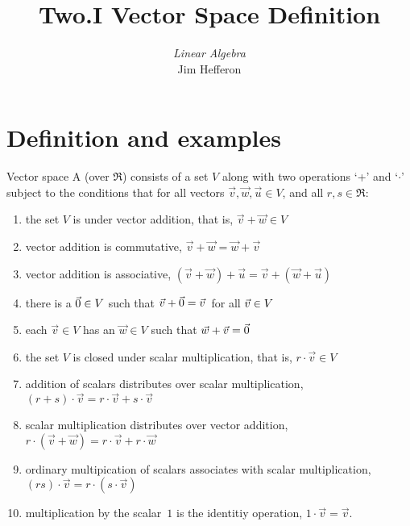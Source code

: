 \documentclass[10pt,t]{beamer}
\title[Vector Space Definition] %
{Two.I Vector Space Definition}
\author{\textit{Linear Algebra} \\ {\small Jim Hef{}feron}}
\institute{
  \texttt{http://joshua.smcvt.edu/linearalgebra}
}
\date{}
\begin{document}
\begin{frame}
  \titlepage
\end{frame}




\section{Definition and examples}





\begin{frame}{Vector space}
A 
(over \( \Re \)) consists of a set \( V \) along with
two operations `+' and `\( \cdot \)' subject to the conditions
that for all vectors \( \vec{v},\vec{w},\vec{u}\in V \), 
and all 
\( r,s\in\Re \):
\begin{enumerate}
\item the set $V$ is  under
  vector addition, that is, 
  \( \vec{v}+\vec{w}\in V \)
\pause\item vector addition is commutative,
  \( \vec{v}+\vec{w}=\vec{w}+\vec{v} \) 
\pause\item vector addition is associative,
  \( (\vec{v}+\vec{w})+\vec{u}=\vec{v}+(\vec{w}+\vec{u}) \)
\pause\item there is a 
    \( \vec{0}\in V \) such that
    \( \vec{v}+\vec{0}=\vec{v}\, \) for all \( \vec{v}\in V\/ \)
\pause\item each \( \vec{v}\in V \) has an
    \( \vec{w}\in V \) such that \( \vec{w}+\vec{v}=\vec{0} \)
\pause\item  the set $V$ is closed under
    scalar multiplication, that is, 
   \( r\cdot\vec{v}\in V \)
\pause\item addition of scalars distributes over scalar multiplication,
 \( (r+s)\cdot\vec{v}=r\cdot\vec{v}+s\cdot\vec{v} \)
\pause\item scalar multiplication distributes over vector addition,
  \( r\cdot(\vec{v}+\vec{w})=r\cdot\vec{v}+r\cdot\vec{w} \)
\pause\item ordinary multipication of scalars associates with 
  scalar multiplication, \( (rs)\cdot\vec{v} =r\cdot(s\cdot\vec{v}) \)
\pause\item multiplication by the scalar~$1$ is the 
  identitiy operation, \( 1\cdot\vec{v}=\vec{v} \).
\end{enumerate}
\end{frame}
\end{document}
